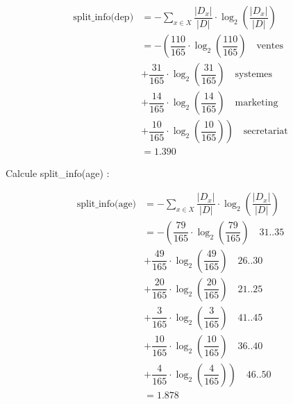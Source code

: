 \documentclass{article}
\begin{document}
\begin{align*}
    \text{split\_info(dep)} &= - \sum_{x \in X} \dfrac{|D_x|}{|D|} \cdot \log_2\left( \dfrac{|D_x|}{|D|} \right) \\[0.25cm]
                            &= - \left( \dfrac{110}{165} \cdot  \log_2\left( \dfrac{110}{165} \right) \quad \text{ventes} \right. \\[0.25cm]
                            &+ \dfrac{31}{165} \cdot  \log_2\left( \dfrac{31}{165} \right) \quad \text{systemes} \\[0.25cm]
                            &+ \dfrac{14}{165} \cdot  \log_2\left( \dfrac{14}{165} \right) \quad \text{marketing} \\[0.25cm]
                            &+ \left. \dfrac{10}{165} \cdot  \log_2\left( \dfrac{10}{165} \right)\right) \quad \text{secretariat}  \\[0.25cm]
                            & = 1.390
\end{align*}

\newpage

Calcule split\_info(age) :


\begin{align*}
    \text{split\_info(age)} &= - \sum_{x \in X} \dfrac{|D_x|}{|D|} \cdot \log_2\left( \dfrac{|D_x|}{|D|} \right) \\[0.25cm]
                            &= - \left( \dfrac{79}{165} \cdot  \log_2\left( \dfrac{79}{165} \right) \quad \text{31..35} \right. \\[0.25cm]
                            &+ \dfrac{49}{165} \cdot  \log_2\left( \dfrac{49}{165} \right) \quad \text{26..30} \\[0.25cm]
                            &+ \dfrac{20}{165} \cdot  \log_2\left( \dfrac{20}{165} \right) \quad \text{21..25} \\[0.25cm]
                            &+ \dfrac{3}{165} \cdot  \log_2\left( \dfrac{3}{165} \right) \quad \text{41..45} \\[0.25cm]
                            &+ \dfrac{10}{165} \cdot  \log_2\left( \dfrac{10}{165} \right) \quad \text{36..40} \\[0.25cm]
                            &+ \left. \dfrac{4}{165} \cdot  \log_2\left( \dfrac{4}{165} \right)\right) \quad \text{46..50}  \\[0.25cm]
                            & = 1.878
\end{align*}


\vspace{0.45cm}
\end{document}
